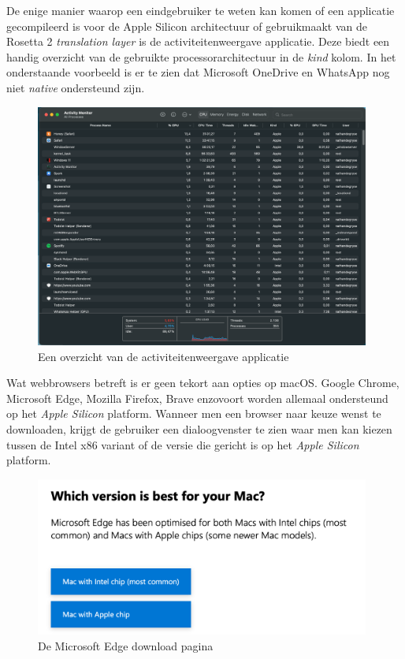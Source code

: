 De enige manier waarop een eindgebruiker te weten kan komen of een applicatie gecompileerd is voor de Apple Silicon architectuur of gebruikmaakt van de Rosetta 2 \textit{translation layer} is de activiteitenweergave applicatie. Deze biedt een handig overzicht van de gebruikte processorarchitectuur in de \textit{kind} kolom. In het onderstaande voorbeeld is er te zien dat Microsoft OneDrive en WhatsApp nog niet \textit{native} ondersteund zijn.

\begin{figure}[!h]
	\centering
	\includegraphics[width=110mm, scale=0.7]{img/activitymonitor_macOSM1.png}
	\caption{Een overzicht van de activiteitenweergave applicatie}
\end{figure}

Wat webbrowsers betreft is er geen tekort aan opties op macOS. Google Chrome, Microsoft Edge, Mozilla Firefox, Brave enzovoort worden allemaal ondersteund op het \textit{Apple Silicon} platform. Wanneer men een browser naar keuze wenst te downloaden, krijgt de gebruiker een dialoogvenster te zien waar men kan kiezen tussen de Intel x86 variant of de versie die gericht is op het \textit{Apple Silicon} platform.

\begin{figure}[!h]
	\centering
	\includegraphics[width=110mm, scale=0.7]{img/browserversie_macOSM1.png}
	\caption{De Microsoft Edge download pagina \autocite{Microsoft2022}}
\end{figure}


